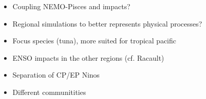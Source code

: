 \begin{itemize}
    \item Coupling NEMO-Pisces and impacts?  %
    \item Regional simulations to better represents physical processes? %
    \item Focus species (tuna), more suited for tropical pacific
    \item ENSO impacts in the other regions (cf. Racault)  
    \item Separation of CP/EP Ninos  %
    \item Different communitities
\end{itemize}




